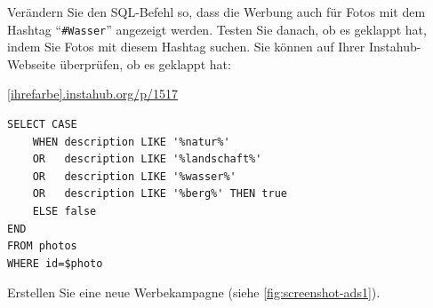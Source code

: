 \begin{myexercise}
  Verändern Sie den SQL-Befehl so, dass die Werbung auch für Fotos mit dem Hashtag \enquote{\texttt{\#Wasser}} angezeigt werden. Testen Sie danach, ob es geklappt hat, indem Sie Fotos mit diesem Hashtag suchen. Sie können auf Ihrer Instahub-Webseite überprüfen, ob es geklappt hat:

  \url{[ihrefarbe].instahub.org/p/1517}

  \begin{myanswer}
    \begin{lstlisting}
SELECT CASE 
	WHEN description LIKE '%natur%' 
	OR   description LIKE '%landschaft%' 
	OR   description LIKE '%wasser%' 
	OR   description LIKE '%berg%' THEN true 
	ELSE false 
END 
FROM photos 
WHERE id=$photo
\end{lstlisting}
  \end{myanswer}
\end{myexercise}

\begin{mychallenge}
  Erstellen Sie eine neue Werbekampagne (siehe \cref{fig:screenshot-ads1}).
\end{mychallenge}

